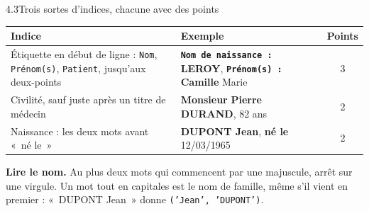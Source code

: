 \documentclass[11pt,aspectratio=169]{beamer}
\newcommand{\tok}[1]{\foreignlanguage{english}{\texttt{#1}}}
\newcommand{\civ}[1]{\textcolor{torange}{\bfseries #1}}   %
\newcommand{\nm}[1]{\textcolor{tgreen}{\bfseries #1}}     %
\newcommand{\lab}[1]{\textcolor{tpurple}{\bfseries #1}}   %
\begin{document}
\begin{frame}{4.3\quad Trois sortes d'indices, chacune avec des points}
  \begin{center}
    \small
    \renewcommand{\arraystretch}{1.3}
    \begin{tabular}{@{}L{4.6cm}L{6.4cm}c@{}}
      \toprule
      \textbf{Indice} & \textbf{Exemple} & \textbf{Points} \\
      \midrule
      Étiquette en début de ligne : \tok{Nom}, \tok{Prénom(s)}, \tok{Patient}, jusqu'aux
        deux-points
        & \lab{\tok{Nom de naissance :}} \nm{LEROY},
          \lab{\tok{Prénom(s) :}} \nm{Camille} Marie & 3 \\
      Civilité, sauf juste après un titre de médecin
        & \civ{Monsieur} \nm{Pierre DURAND}, 82 ans & 2 \\
      Naissance : les deux mots avant «~né le~»
        & \nm{DUPONT Jean}, \civ{né le} 12/03/1965 & 2 \\
      \bottomrule
    \end{tabular}
  \end{center}

  \vspace{0.6em}
  \small
  \textbf{Lire le nom.} Au plus deux mots qui commencent par une majuscule, arrêt sur une
  virgule. Un mot tout en capitales est le nom de famille, même s'il vient en premier :
  «~DUPONT Jean~» donne \tok{('Jean', 'DUPONT')}.
\end{frame}
\end{document}
